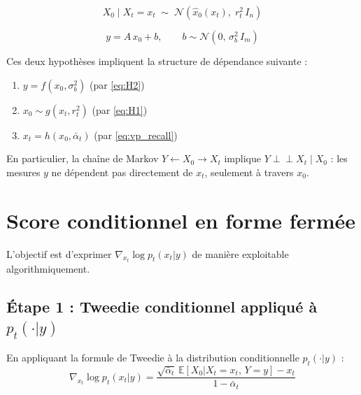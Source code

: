 \documentclass[12pt]{article}
\newcommand{\indep}{\perp\!\!\!\perp}
\begin{document}
\begin{hypothesebox}
\label{hyp:pigdm2}
\begin{equation}
    X_0 \mid X_t = x_t \;\sim\; \mathcal{N}\!\left(\hat{x}_0(x_t),\; r_t^2\, I_n\right)
    \tag{H1}
    \label{eq:H1}
\end{equation}
\end{hypothesebox}

\begin{hypothesebox}
\label{hyp:linear2}
\begin{equation}
    y = A\, x_0 + b, \qquad b \sim \mathcal{N}(0,\, \sigma_b^2\, I_m)
    \tag{H2}
    \label{eq:H2}
\end{equation}
\end{hypothesebox}

Ces deux hypothèses impliquent la structure de dépendance suivante :
\begin{rappelbox}[Dépendances]
\begin{enumerate}[label=(D\arabic*)]
    \item $y = f(x_0, \sigma_b^2)$ \quad (par \ref{eq:H2})
    \item $x_0 \sim g(x_t, r_t^2)$ \quad (par \ref{eq:H1})
    \item $x_t = h(x_0, \bar\alpha_t)$ \quad (par \eqref{eq:vp_recall})
\end{enumerate}
En particulier, la chaîne de Markov $Y \leftarrow X_0 \to X_t$ implique $Y \indep X_t \mid X_0$ : les mesures $y$ ne dépendent pas directement de $x_t$, seulement à travers $x_0$.
\end{rappelbox}


\section{Score conditionnel en forme fermée}

L'objectif est d'exprimer $\nabla_{x_t} \log p_t(x_t | y)$ de manière exploitable algorithmiquement.

\subsection{Étape 1 : Tweedie conditionnel appliqué à $p_t(\cdot | y)$}

\begin{propositionbox}
\label{prop:score_cond_y}
En appliquant la formule de Tweedie à la distribution conditionnelle $p_t(\cdot | y)$ :
\begin{equation}
    \boxed{\nabla_{x_t} \log p_t(x_t | y) = \frac{\sqrt{\bar\alpha_t}\, \mathbb{E}[X_0 | X_t = x_t,\, Y = y] - x_t}{1 - \bar\alpha_t}}
    \label{eq:score_cond_y}
\end{equation}
\end{propositionbox}
\end{document}
